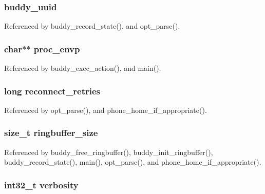 \subsubsection[{buddy\_\-uuid}]{ {\bf buddy\_\-uuid}}\label{buddy_8h_a3e9321d881ca257289c65b5022b693c8}


Referenced by buddy\_\-record\_\-state(), and opt\_\-parse().

\subsubsection[{proc\_\-envp}]{\setlength{\rightskip}{0pt plus 5cm}char$\ast$$\ast$ {\bf proc\_\-envp}}\label{buddy_8h_adcfeefdfcc71ba2dc2cddac18f4dcb4d}


Referenced by buddy\_\-exec\_\-action(), and main().

\subsubsection[{reconnect\_\-retries}]{\setlength{\rightskip}{0pt plus 5cm}long {\bf reconnect\_\-retries}}\label{buddy_8h_a5d96c4625ef6fb62b61353fd2766b0d9}


Referenced by opt\_\-parse(), and phone\_\-home\_\-if\_\-appropriate().

\subsubsection[{ringbuffer\_\-size}]{\setlength{\rightskip}{0pt plus 5cm}size\_\-t {\bf ringbuffer\_\-size}}\label{buddy_8h_aaf0b4e8526897974d594cc330ece0b5c}


Referenced by buddy\_\-free\_\-ringbuffer(), buddy\_\-init\_\-ringbuffer(), buddy\_\-record\_\-state(), main(), opt\_\-parse(), and phone\_\-home\_\-if\_\-appropriate().

\subsubsection[{verbosity}]{\setlength{\rightskip}{0pt plus 5cm}int32\_\-t {\bf verbosity}}\label{buddy_8h_ae58239b03e562b412748d74dece0fcc8}
